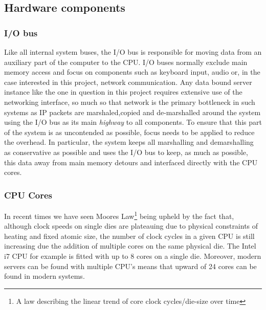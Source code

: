 \documentclass[a4paper,11pt]{scrreprt}
\begin{document}
\subsection{Hardware components}
\subsubsection{I/O bus}
Like all internal system buses, the I/O bus is responsible for moving data from an auxiliary part of the computer to the CPU. I/O buses normally exclude main memory access and focus on components such as keyboard input, audio or, in the case interested in this project, network communication. Any data bound server instance like the one in question in this project requires extensive use of the networking interface, so much so that network is the primary bottleneck in such systems as IP packets are marshaled,copied and de-marshalled around the system using the I/O bus as its main \textit{highway} to all components. To ensure that this part of the system is as uncontended as possible, focus needs to be applied to reduce the overhead. In particular, the system keeps all marshalling and demarshalling as conservative as possible and uses the I/O bus to keep, as much as possible, this data away from main memory detours and interfaced directly with the CPU cores.
\subsubsection{CPU Cores}
In recent times we have seen Moores Law\footnote{A law describing the linear trend of core clock cycles/die-size over time} being upheld by the fact that, although clock speeds on single dies are plateauing due to physical constraints of heating and fixed atomic size, the number of clock cycles in a given CPU is still increasing due the addition of multiple cores on the same physical die. The Intel i7 CPU for example is fitted with up to 8 cores on a single die. Moreover, modern servers can be found with multiple CPU's means that upward of 24 cores can be found in modern systems.
\end{document}
